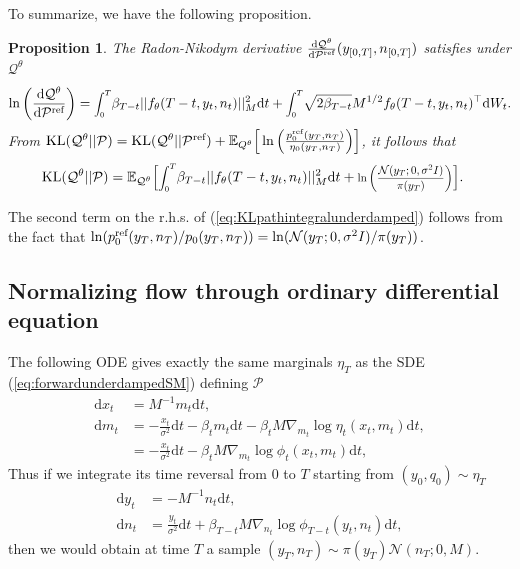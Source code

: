 \documentclass{article} %
\newtheorem{proposition}{Proposition}
\begin{document}
To summarize, we have the following proposition.

\begin{proposition}\label{prop:RNcontinuouunderdamped}The Radon-Nikodym derivative $\frac{\mathrm{d}\mathcal{Q}^{\theta}}{\mathrm{d}\mathcal{P}^{\textup{ref}}}(y_{[0,T]},n_{[0,T]})$ satisfies under $\mathcal{Q}^{\theta}$
\begin{equation}
  \log \left(\frac{\mathrm{d}\mathcal{Q}^{\theta}}{\mathrm{d}\mathcal{P}^{\textup{ref}}}\right)
    =\scaleobj{.8}{\int^T_0} \beta_{T-t}|| f_{\theta}(T-t,y_t,n_t)||^2_{M} \mathrm{d}t+\scaleobj{.8}{\int^T_0} \sqrt{2\beta_{T-t}}M^{1/2} f_{\theta}(T-t,y_t,n_t)^\top \mathrm{d}W_t \label{eq:RNunderdamped}.
\end{equation}
From $\KL(\mathcal{Q}^{\theta}||\mathcal{P})=\KL(\mathcal{Q}^{\theta}||\mathcal{P}^{\textup{ref}})+\mathbb{E}_{Q^{\theta}}\Bigr[\log \left(\frac{p^{\textup{ref}}_0(y_T,n_T)}{\eta_0(y_T,n_T)}\right)\Bigr]$, it follows that
\begin{align}
\KL(\mathcal{Q}^{\theta}||\mathcal{P})
 &=\mathbb{E}_{\mathcal{Q}^{\theta}}\Bigr[\scaleobj{.8}{\int^T_0} \beta_{T-t}|| f_{\theta}(T-t,y_t,n_t)||^2_{M} \mathrm{d}t +\scaleobj{.8}{\ln \left(\frac{\gN(y_T; 0, \sigma^2 I)}{\pi(y_T)}\right)}\Bigr]\label{eq:KLpathintegralunderdamped}.
\end{align}
\end{proposition}
The second term on the r.h.s. of (\ref{eq:KLpathintegralunderdamped}) follows from the fact that $\log (p^{\textup{ref}}_0(y_T,n_T)/p_0(y_T,n_T))=\log (\mathcal{N}(y_T;0,\sigma^2I)/\pi(y_T))$.


\subsection{Normalizing flow through ordinary differential equation \label{app:NFunderdamped}}
The following ODE gives exactly the same marginals $\eta_T$ as the SDE (\ref{eq:forwardunderdampedSM}) defining $\mathcal{P}$
\begin{align}\label{eq:ODEunderdampedSM}
    \mathrm{d}x_t&=M^{-1}m_t\mathrm{d}t,\\
    \mathrm{d}m_t&=-\frac{x_t}{\sigma^2}\mathrm{d}t -\beta_t m_t\mathrm{d}t -\beta_t M \nabla_{m_t} \log \eta_{t}(x_t,m_t) \mathrm{d}t,\nonumber\\
     &=-\frac{x_t}{\sigma^2}\mathrm{d}t-\beta_t M \nabla_{m_t} \log \phi_{t}(x_t,m_t) \mathrm{d}t, \nonumber
\end{align}
Thus if we integrate its time reversal from $0$ to $T$ starting from $(y_0,q_0)\sim \eta_T$
\begin{align}\label{eq:reversalODEunderdampedSM}
    \mathrm{d}y_t&=-M^{-1}n_t\mathrm{d}t,\\
    \mathrm{d}n_t&= \frac{y_t}{\sigma^2}\mathrm{d}t+\beta_{T-t} M \nabla_{n_t} \log \phi_{T-t}(y_t,n_t) \mathrm{d}t,\nonumber
\end{align}
then we would obtain at time $T$ a sample $(y_T,n_T)\sim  \pi(y_T)\mathcal{N}(n_T;0,M)$. 
\end{document}

